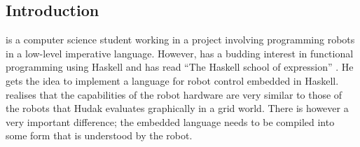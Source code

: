 



% 






% 



\subsection{Introduction}
\studname{} is a computer science student working in a project involving programming 
robots in a low-level imperative language. However, \studname{} has a budding 
interest in functional programming using Haskell and has read ``The Haskell 
school of expression'' \cite{HUDAK}. He gets the idea to implement 
a language for robot control embedded in Haskell. \studname{} realises that the 
capabilities of the robot hardware are very similar to those of the 
robots that Hudak evaluates graphically in a grid world. There is however 
a very important difference; the embedded language needs to be compiled into 
some form that is understood by the robot. 

